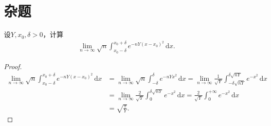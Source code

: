 \documentclass[../../main.tex]{subfiles}%
\begin{document}
\section{杂题}

\begin{example}
设$Y,x_0,\delta > 0$，计算
\begin{align*}
\lim_{n \to \infty} \sqrt{n} \int_{x_0 - \delta}^{x_0 + \delta} e^{-nY(x - x_0)^2} \,\mathrm{d}x.
\end{align*}
\end{example}
\begin{proof}
\begin{align*}
\underset{n\rightarrow \infty}{\lim}\sqrt{n}\int_{x_0-\delta}^{x_0+\delta}{e^{-nY(x-x_0)^2}\,\mathrm{d}x}&=\underset{n\rightarrow \infty}{\lim}\sqrt{n}\int_{-\delta}^{\delta}{e^{-nYx^2}\,\mathrm{d}x}=\underset{n\rightarrow \infty}{\lim}\frac{1}{\sqrt{Y}}\int_{-\delta \sqrt{nY}}^{\delta \sqrt{nY}}{e^{-x^2}\,\mathrm{d}x}
\\
&=\underset{n\rightarrow \infty}{\lim}\frac{2}{\sqrt{Y}}\int_0^{\delta \sqrt{nY}}{e^{-x^2}\,\mathrm{d}x}=\frac{2}{\sqrt{Y}}\int_0^{+\infty}{e^{-x^2}\,\mathrm{d}x}
\\
&=\sqrt{\frac{\pi}{Y}}.
\end{align*}
\end{proof}
\end{document}
